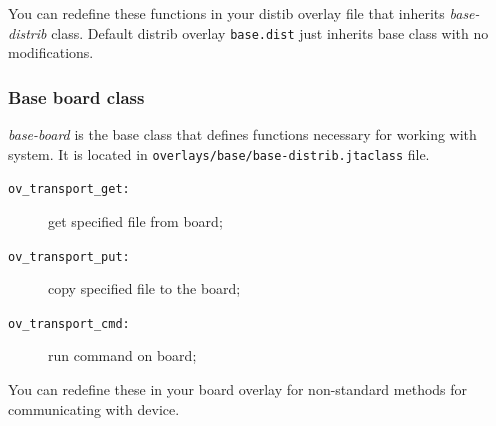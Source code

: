 You can redefine these functions in your distib overlay file that inherits \textit{base-distrib} class. Default distrib overlay \texttt{base.dist} just inherits base class with no modifications.

\subsubsection{Base board class}
\textit{base-board} is the base class that defines functions necessary for working with system. It is located in \texttt{overlays/base/base-distrib.jtaclass} file.

\begin{description}
\item[\texttt{ov\_transport\_get:}] get specified file from board;
\item[\texttt{ov\_transport\_put:}] copy specified file to the board;
\item[\texttt{ov\_transport\_cmd:}] run command on board;
\end{description}

You can redefine these in your board overlay for non-standard methods for communicating with device.






